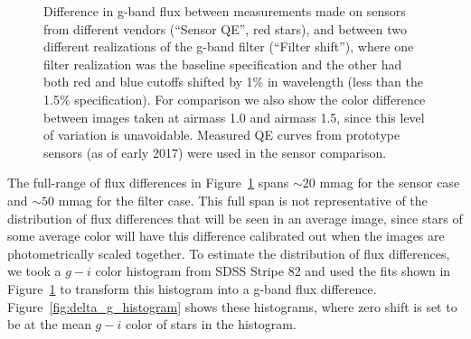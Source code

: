 \documentclass[DM,toc,lsstdraft]{lsstdoc}
\begin{document}
\begin{figure}
\caption{Difference in g-band flux between measurements made on sensors from
different vendors (``Sensor QE'', red stars), and between two different
realizations of the g-band filter (``Filter shift''), where one filter
realization was the baseline specification and the other had both red and blue
cutoffs shifted by 1\% in wavelength (less than the 1.5\% specification). For
comparison we also show the color difference between images taken at airmass 1.0
and airmass 1.5, since this level of variation is unavoidable. Measured QE
curves from prototype sensors (as of early 2017) were used in the sensor
comparison.
\label{fig:delta_g_vs_color}}
\end{figure}

The full-range of flux differences in Figure~\ref{fig:delta_g_vs_color} spans
$\sim 20$ mmag for the sensor case and $\sim 50$ mmag for the filter case. This
full span is not representative of the distribution of flux differences that
will be seen in an average image, since stars of some average color will have
this difference calibrated out when the images are photometrically scaled
together. To estimate the distribution of flux differences, we took a $g-i$
color histogram from SDSS Stripe 82 and used the fits shown in
Figure~\ref{fig:delta_g_vs_color} to transform this histogram into a g-band flux
difference. Figure~\ref{fig:delta_g_histogram} shows these histograms, where zero
shift is set to be at the mean $g-i$ color of stars in the histogram.
\end{document}
